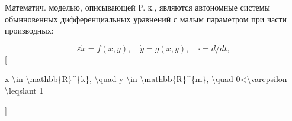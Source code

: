 \documentclass[10pt]{article}
\begin{document}
Математич. моделью, описывающей Р. к., являются автономные системы обынновенных дифференциальных уравнений с малым параметром при части производных:



\[

\varepsilon \dot{x}=f(x, y), \quad \dot{y}=g(x, y), \quad \cdot=d / d t,

\][



x \textbackslash in \textbackslash mathbb\{R\}\^{}\{k\}, \textbackslash quad y \textbackslash in \textbackslash mathbb\{R\}\^{}\{m\}, \textbackslash quad 0<\textbackslash varepsilon \textbackslash leqslant 1

]
\end{document}
